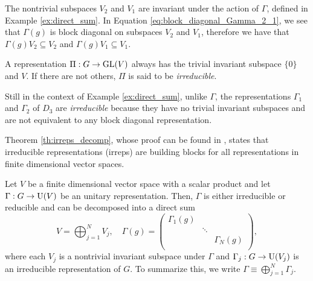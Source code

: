 \begin{example} \label{ex:invariant_subspaces}
The nontrivial subspaces $V_2$ and $V_1$ are invariant under the action of $\Gamma$, defined in Example \ref{ex:direct_sum}. In Equation \ref{eq:block_diagonal_Gamma_2_1}, we see that $\Gamma(g)$ is block diagonal on subspaces $V_2$ and $V_1$, therefore we have that $\Gamma(g) V_2 \subseteq V_2$ and $\Gamma(g) V_1 \subseteq V_1$.
\end{example}

\begin{definition} \label{def:irrep}
A representation $\Pi: G \to {\text{GL}}(V)$ always has the trivial invariant subspace $\{0\}$ and $V$. If there are not others, $\Pi$ is said to be \textit{irreducible}.
\end{definition}

\begin{example} \label{ex:irrep_Gamma12_example}
Still in the context of Example \ref{ex:direct_sum}, unlike $\Gamma$, the representations $\Gamma_1$ and $\Gamma_2$ of $D_3$ are \textit{irreducible} because they have no trivial invariant subspaces and are not equivalent to any block diagonal representation.
\end{example}

Theorem \ref{th:irreps_decomp}, whose proof can be found in \cite{dresselhaus, hamermesh}, states that irreducible representations (irreps) are building blocks for all representations in finite dimensional vector spaces.

\begin{theorem} \label{th:irreps_decomp}
Let $V$ be a finite dimensional vector space with a scalar product and let $\Gamma: G \to {\text{U}}(V)$ be an unitary representation. Then, $\Gamma$ is either irreducible or reducible and can be decomposed into a direct sum
\begin{equation} \label{eq:decomp_unitary_reps}
V = \bigoplus_{j=1}^N V_j, \quad
\Gamma(g) =
\begin{pmatrix}
\Gamma_1(g) &  &  \\
 & \ddots &  \\
 &  & \Gamma_N(g) \\
\end{pmatrix},
\end{equation}
where each $V_j$ is a nontrivial invariant subspace under $\Gamma$ and $\Gamma_j: G \to {\text{U}}(V_j)$ is an irreducible representation of $G$. To summarize this, we write $\Gamma \equiv \bigoplus_{j=1}^N \Gamma_j$.
\end{theorem}

